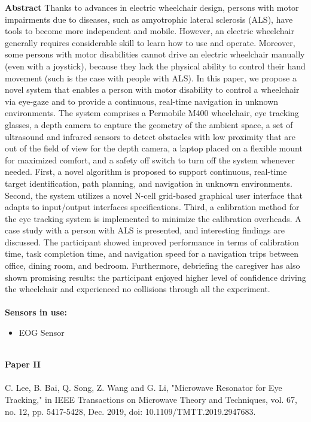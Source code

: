 \noindent
\textbf{Abstract} Thanks to advances in electric wheelchair design, persons with motor impairments due to diseases, such as amyotrophic lateral sclerosis (ALS), have tools to become more independent and mobile. However, an electric wheelchair generally requires considerable skill to learn how to use and operate. Moreover, some persons with motor disabilities cannot drive an electric wheelchair manually (even with a joystick), because they lack the physical ability to control their hand movement (such is the case with people with ALS). In this paper, we propose a novel system that enables a person with motor disability to control a wheelchair via eye-gaze and to provide a continuous, real-time navigation in unknown environments. The system comprises a Permobile M400 wheelchair, eye tracking glasses, a depth camera to capture the geometry of the ambient space, a set of ultrasound and infrared sensors to detect obstacles with low proximity that are out of the field of view for the depth camera, a laptop placed on a flexible mount for maximized comfort, and a safety off switch to turn off the system whenever needed. First, a novel algorithm is proposed to support continuous, real-time target identification, path planning, and navigation in unknown environments. Second, the system utilizes a novel N-cell grid-based graphical user interface that adapts to input/output interfaces specifications. Third, a calibration method for the eye tracking system is implemented to minimize the calibration overheads. A case study with a person with ALS is presented, and interesting findings are discussed. The participant showed improved performance in terms of calibration time, task completion time, and navigation speed for a navigation trips between office, dining room, and bedroom. Furthermore, debriefing the caregiver has also shown promising results: the participant enjoyed higher level of confidence driving the wheelchair and experienced no collisions through all the experiment.
\\ \\


\noindent
\textbf{Sensors in use:}
\begin{itemize}
    \item EOG Sensor \\ \\
\end{itemize}


\noindent
\textbf{Paper II} 
\\ \\
\noindent
C. Lee, B. Bai, Q. Song, Z. Wang and G. Li, "Microwave Resonator for Eye Tracking," in IEEE Transactions on Microwave Theory and Techniques, vol. 67, no. 12, pp. 5417-5428, Dec. 2019, doi: 10.1109/TMTT.2019.2947683.\\ \\



